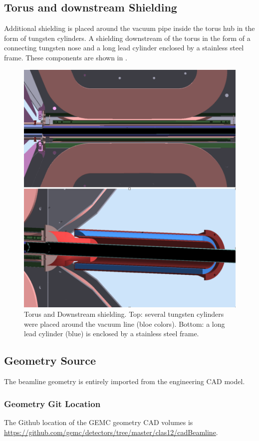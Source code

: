 \subsection{Torus and downstream Shielding}
Additional shielding is placed around the vacuum pipe inside the torus hub in the form of tungsten cylinders.
A shielding downstream of the torus in the form of a connecting tungsten nose and a long lead cylinder enclosed by a stainless steel frame.
These components are shown in .

\begin{figure}
	\centering
	\includegraphics[width=0.98\columnwidth,keepaspectratio]{img/downstreamShielding.png}
	\caption{Torus and Downstream shielding. Top: several tungsten cylinders were placed around the vacuum line (bloe colors).
            Bottom: a long lead cylinder (blue) is enclosed by a stainless steel frame.}
	\label{fig:downstreamShielding}
\end{figure}



\subsection{Geometry Source}

The beamline geometry is entirely imported from the engineering CAD model.

\subsubsection{Geometry Git Location}

The Github location of the GEMC geometry CAD volumes is \url{https://github.com/gemc/detectors/tree/master/clas12/cadBeamline}.
